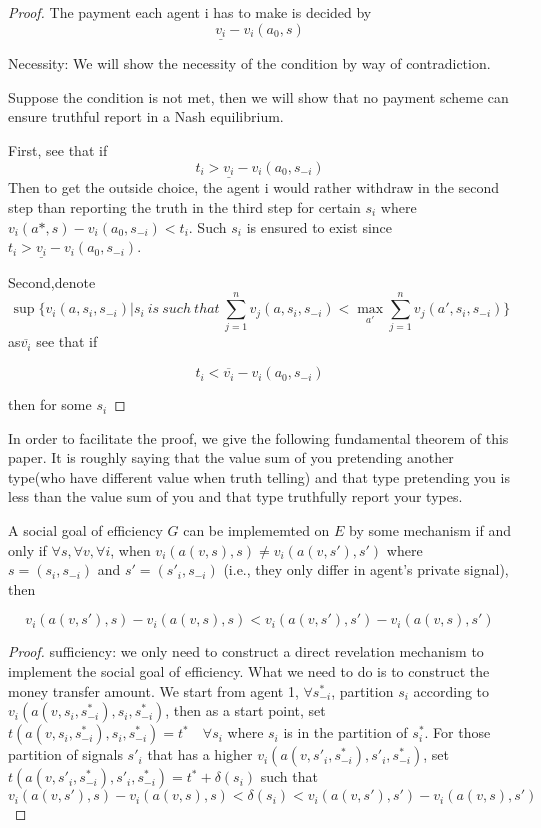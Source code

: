 \begin{prop}
\begin{proof}
The payment each agent i has to make is decided by
$$\underline{v_i}-v_i(a_0,s)$$

Necessity:
We will show the necessity of the condition by way of contradiction. 

Suppose the condition is not met, then we will show that no payment scheme can ensure truthful report in a Nash equilibrium.

First, see that if 
$$t_i> \underline{v_i}-v_i(a_0,s_{-i})$$
Then to get the outside choice, the agent i would rather withdraw in the second step than reporting the truth in the third step  
for certain $s_i$ where $v_i(a*, s)-v_i(a_0,s_{-i}) <t_i$. Such $s_i$ is ensured to exist 
since $t_i> \underline{v_i}-v_i(a_0,s_{-i})$.

Second,denote
$$\sup \{v_i(a, s_i, s_{-i})|s_i\ is \ such \ that\ \sum_{j=1}^n v_j(a, s_i, s_{-i}) < \max_{a'} \sum_{j=1}^n v_j(a', s_i, s_{-i})\}$$
as$\overline{v_i}$
see that if 

$$t_i<\overline{v_i}-v_i(a_0,s_{-i})$$ 

then for some $s_i$

\end{proof}

In order to facilitate the proof, we give the following fundamental theorem of this paper.
It is roughly saying that the value sum of you pretending another type(who have different value when truth telling)
and that type pretending you is less than the value sum of 
you and that type truthfully report your types.
\begin{lemma}\label{thm}
A social goal of efficiency $G$ can be implememted on $E$  by some mechanism if and only if $\forall s, \forall v, \forall i$, when 
$v_i(a(v,s), s)\neq v_i(a(v,s'),s')$ where  $s=(s_i, s_{-i})$ and 
$s'=(s'_i, s_{-i})$ (i.e., they only differ in agent's private signal), then

\begin{equation*}\label{equ}
v_i(a(v,s'),s)-v_i(a(v,s), s)<v_i(a(v,s'),s')-v_i(a(v,s), s')
\end{equation*}

\end{lemma}
\begin{proof}
sufficiency: we only need to construct a direct revelation mechanism to implement the social goal of 
efficiency. What we need to do is to construct the money transfer amount. We start from agent 1, $\forall s_{-i}^*$, partition
$s_i$ according to $v_i(a(v,s_i,s_{-i}^*),s_i,s_{-i}^*)$, then as a start point, set 
$t(a(v,s_i,s_{-i}^*),s_i,s_{-i}^*)=t^*\quad\forall s_i $  where $s_i$ is in the partition of $s_i^*$. For those partition of 
signals $s'_i$ that has a higher $v_i(a(v,s'_i,s_{-i}^*),s'_i,s_{-i}^*)$, set $t(a(v,s'_i,s_{-i}^*),s'_i,s_{-i}^*)=t^*+\delta(s_i)$
such that $v_i(a(v,s'),s)-v_i(a(v,s), s)<\delta(s_i)<v_i(a(v,s'),s')-v_i(a(v,s), s')$


\end{proof}
\end{prop}
